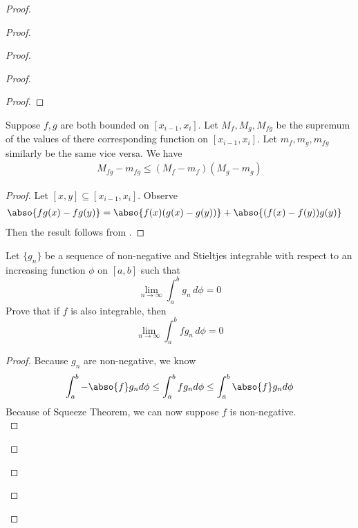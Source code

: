 \documentclass{report}
\begin{document}
\begin{proof}
\begin{proof}
\begin{proof}
\begin{proof}
\begin{proof}
\end{proof}
\begin{lemma}
\label{11.7.2}
Suppose $f,g$ are both bounded on  $[x_{i-1},x_i]$. Let $M_f,M_g,M_{fg}$ be the supremum of the values of there corresponding function on $[x_{i-1},x_i]$. Let $m_f,m_g,m_{fg}$ similarly be the same vice versa. We have 
\begin{align*}
M_{fg}-m_{fg}\leq (M_f-m_f)(M_g-m_g)
\end{align*}
\end{lemma}
\begin{proof}
Let $[x,y]\subseteq [x_{i-1},x_i]$. Observe 
\begin{align*}
\abso{fg(x)-fg(y)}&=\abso{f(x)(g(x)-g(y))}+\abso{(f(x)-f(y))g(y)}
\end{align*}
Then the result follows from . \end{proof}
\begin{question}{}{}

Let \( \{g_n\} \) be a sequence of non-negative and Stieltjes integrable with respect to an increasing function \( \phi \) on \( [a, b] \) such that
\[ \lim_{n \to \infty} \int_{a}^{b} g_n \, d\phi = 0 \]
Prove that if \( f \) is also integrable, then
\[ \lim_{n \to \infty} \int_{a}^{b} f g_n \, d\phi = 0 \]
\end{question}
\begin{proof}
Because $g_n$ are non-negative, we know 
 \begin{align*}
\int_a^b -\abso{f}g_nd\phi\leq \int_a^b fg_nd\phi \leq \int_a^b \abso{f}g_nd\phi
\end{align*}
Because of Squeeze Theorem, we can now suppose $f$ is non-negative.\\


\end{proof}
\end{proof}
\end{proof}
\end{proof}
\end{proof}
\end{document}
